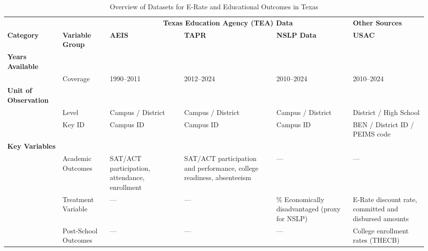 



\begin{landscape}
\begin{table}[htbp]
\centering
\caption{Overview of Datasets for E-Rate and Educational Outcomes in Texas}
\label{tab:data_overview}
\renewcommand{\arraystretch}{1.4} %
\setlength{\tabcolsep}{8pt}       %

\begin{threeparttable}
\begin{tabular}{@{}p{3cm}p{2cm}p{3cm}p{3cm}p{3cm}p{5cm}@{}}
\toprule
 & & \multicolumn{3}{c}{\textbf{Texas Education Agency (TEA) Data}} & \textbf{Other Sources} \\
\cmidrule(lr){3-5}
\textbf{Category} & \textbf{Variable Group} & \textbf{AEIS} & \textbf{TAPR} & \textbf{NSLP Data} & \textbf{USAC} \\
\midrule
\textbf{Years Available} & & & & & \\ 
 & Coverage & 1990--2011 & 2012--2024 & 2010--2024 & 2010--2024 \\
\midrule
\textbf{Unit of Observation} & & & & & \\ %
 & Level & Campus / District & Campus / District & Campus / District & District / High School \\
 & Key ID & Campus ID & Campus ID & Campus ID & BEN / District ID / PEIMS code \\
\midrule
\textbf{Key Variables} & & & & & \\ 
 & Academic Outcomes & SAT/ACT participation, attendance, enrollment & SAT/ACT participation and performance, college readiness, absenteeism & --- & --- \\
 & Treatment Variable & --- & --- & \% Economically disadvantaged (proxy for NSLP) & E-Rate discount rate, committed and disbursed amounts \\
 & Post-School Outcomes & --- & --- & --- & College enrollment rates (THECB) \\
\bottomrule
\end{tabular}
\end{threeparttable}
\end{table}
\end{landscape}






